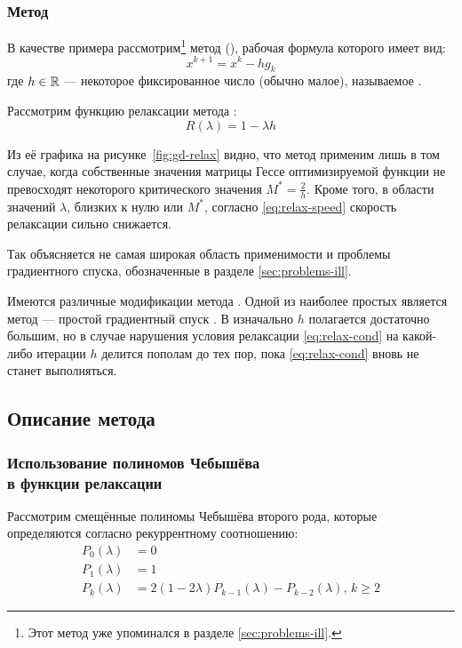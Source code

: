 \subsubsection{Метод \gd{}}
\label{sec:gd}

В качестве примера рассмотрим\footnote{Этот метод уже упоминался в
  разделе \ref{sec:problems-ill}.} метод  (\gd{}), рабочая формула которого имеет вид:
\begin{equation}
  \label{eq:gd-workhorse}
  x^{k+1}=x^k-hg_k
\end{equation}
где $h\in\mathbb{R}$ — некоторое фиксированное число (обычно малое),
называемое .

Рассмотрим функцию релаксации метода \gd{}:
\begin{equation}
  \label{eq:gd-relax}
  R(\lambda) = 1 - \lambda h
\end{equation}



Из её графика на рисунке \ref{fig:gd-relax} видно, что метод применим
лишь в том случае, когда собственные значения матрицы Гессе
оптимизируемой функции не превосходят некоторого критического значения
$M^*=\frac{2}{h}$. Кроме того, в области значений $\lambda$, близких к
нулю или $M^*$, согласно \eqref{eq:relax-speed} скорость релаксации
сильно снижается. 

Так объясняется не самая широкая область применимости \gd{} и проблемы
градиентного спуска, обозначенные в разделе \ref{sec:problems-ill}.

Имеются различные модификации метода \gd{}. Одной из наиболее простых
является метод \rgd{} — простой градиентный спуск . В \rgd{} изначально $h$ полагается достаточно большим, но в
случае нарушения условия релаксации \eqref{eq:relax-cond} на
какой-либо итерации $h$ делится пополам до тех пор, пока
\eqref{eq:relax-cond} вновь не станет выполняться.

\subsection{Описание метода \relch{}}

\subsubsection{Использование полиномов Чебышёва\\
  в функции релаксации}

Рассмотрим смещённые полиномы Чебышёва второго рода, которые
определяются согласно рекуррентному соотношению:
\begin{align}
  \label{eq:chebyshev}
  P_0(\lambda) &= 0 \\
  P_1(\lambda) &= 1 \\
  P_k(\lambda) &= 2(1-2\lambda)P_{k-1}(\lambda) - P_{k-2}(\lambda),\, k
  \geq 2
\end{align}

